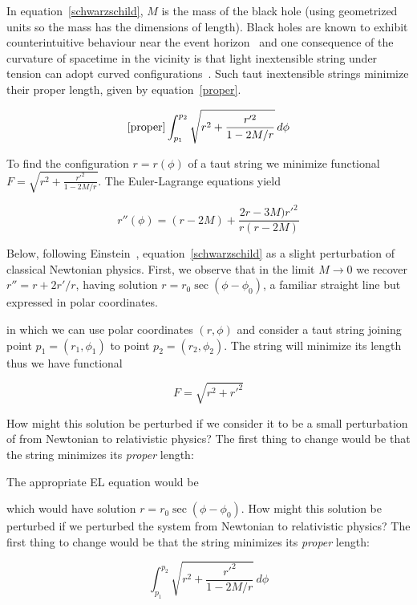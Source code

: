 \documentclass[pdflatex,sn-mathphys-num]{sn-jnl}%
\theoremstyle{thmstyleone}%
\theoremstyle{thmstyletwo}%
\theoremstyle{thmstylethree}%
\begin{document}
In equation~\ref{schwarzschild}, $M$ is the mass of the black hole
(using geometrized units so the mass has the dimensions of length).
Black holes are known to exhibit counterintuitive behaviour near the
event horizon~\cite{scientificamerican123} and one consequence of the
curvature of spacetime in the vicinity is that light inextensible
string under tension can adopt curved
configurations~\cite{hankin2022}.  Such taut inextensible strings
minimize their proper length, given by equation~\ref{proper}.

\begin{equation}\ref{proper}
  \int_{p_1}^{p_2}\sqrt{r^2 + \frac{r'^2}{1-2M/r}}\,d\phi
\end{equation}

To find the configuration $r=r(\phi)$ of a taut string we minimize
functional $F=\sqrt{r^2 + \frac{r'^2}{1-2M/r}}$.  The Euler-Lagrange
equations yield

\begin{equation}\label{eulerstring}
  r''(\phi) = (r-2M) + \frac{2r-3M)r'^2}{r(r-2M)}
\end{equation}


Below, following Einstein~\cite{einstein_mercury},
equation~\ref{schwarzschild} as a slight perturbation of classical
Newtonian physics.  First, we observe that in the limit
$M\longrightarrow 0$ we recover $r'' = r + 2r'/r$, having solution
$r=r_0\sec(\phi-\phi_0)$, a familiar straight line but expressed in
polar coordinates.

in which we can use polar coordinates $(r,\phi)$
and consider a taut string joining point $p_1=(r_1,\phi_1)$ to point
$p_2=(r_2,\phi_2)$.  The string will minimize its length thus we have
functional

\begin{equation}
  F=\sqrt{r^2 + r'^2}
\end{equation}

How might this solution be perturbed if we consider it to be a small
perturbation of from Newtonian to relativistic physics?  The first
thing to change would be that the string minimizes its {\em proper}
length:

The appropriate EL equation would be


which would have solution $r=r_0\sec(\phi-\phi_0)$.  How might this
solution be perturbed if we perturbed the system from Newtonian to
relativistic physics?  The first thing to change would be that the
string minimizes its {\em proper} length:

\begin{equation}
  \int_{p_1}^{p_2}\sqrt{r^2 + \frac{r'^2}{1-2M/r}}\,d\phi
\end{equation}
\end{document}
